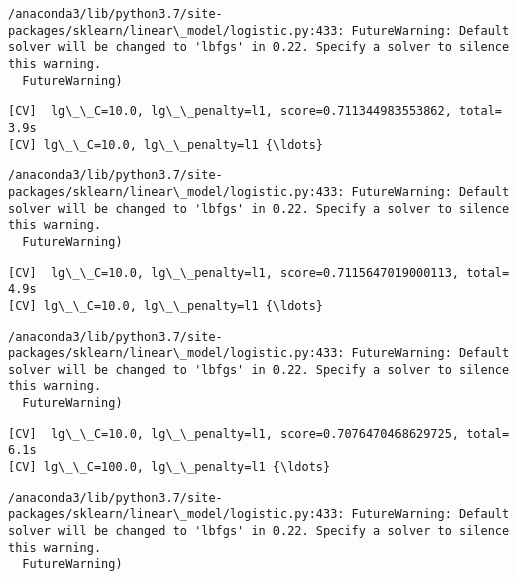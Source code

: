 \documentclass[11pt]{article}
\begin{document}
    \begin{Verbatim}[commandchars=\\\{\}]
/anaconda3/lib/python3.7/site-packages/sklearn/linear\_model/logistic.py:433: FutureWarning: Default solver will be changed to 'lbfgs' in 0.22. Specify a solver to silence this warning.
  FutureWarning)

    \end{Verbatim}

    \begin{Verbatim}[commandchars=\\\{\}]
[CV]  lg\_\_C=10.0, lg\_\_penalty=l1, score=0.711344983553862, total=   3.9s
[CV] lg\_\_C=10.0, lg\_\_penalty=l1 {\ldots}

    \end{Verbatim}

    \begin{Verbatim}[commandchars=\\\{\}]
/anaconda3/lib/python3.7/site-packages/sklearn/linear\_model/logistic.py:433: FutureWarning: Default solver will be changed to 'lbfgs' in 0.22. Specify a solver to silence this warning.
  FutureWarning)

    \end{Verbatim}

    \begin{Verbatim}[commandchars=\\\{\}]
[CV]  lg\_\_C=10.0, lg\_\_penalty=l1, score=0.7115647019000113, total=   4.9s
[CV] lg\_\_C=10.0, lg\_\_penalty=l1 {\ldots}

    \end{Verbatim}

    \begin{Verbatim}[commandchars=\\\{\}]
/anaconda3/lib/python3.7/site-packages/sklearn/linear\_model/logistic.py:433: FutureWarning: Default solver will be changed to 'lbfgs' in 0.22. Specify a solver to silence this warning.
  FutureWarning)

    \end{Verbatim}

    \begin{Verbatim}[commandchars=\\\{\}]
[CV]  lg\_\_C=10.0, lg\_\_penalty=l1, score=0.7076470468629725, total=   6.1s
[CV] lg\_\_C=100.0, lg\_\_penalty=l1 {\ldots}

    \end{Verbatim}

    \begin{Verbatim}[commandchars=\\\{\}]
/anaconda3/lib/python3.7/site-packages/sklearn/linear\_model/logistic.py:433: FutureWarning: Default solver will be changed to 'lbfgs' in 0.22. Specify a solver to silence this warning.
  FutureWarning)

    \end{Verbatim}
\end{document}
